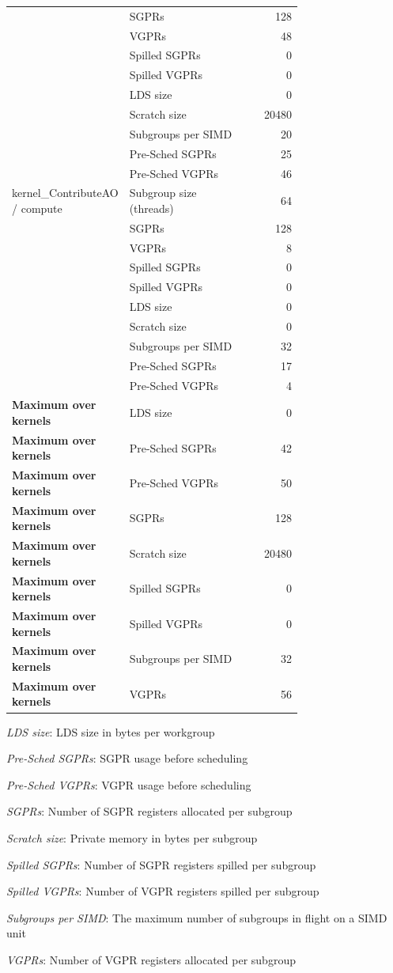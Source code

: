 \begin{longtable}{p{0.30\linewidth}p{0.43\linewidth}r}
 & SGPRs & 128 \\
 & VGPRs & 48 \\
 & Spilled SGPRs & 0 \\
 & Spilled VGPRs & 0 \\
 & LDS size & 0 \\
 & Scratch size & 20480 \\
 & Subgroups per SIMD & 20 \\
 & Pre-Sched SGPRs & 25 \\
 & Pre-Sched VGPRs & 46 \\
\hline
kernel\_ContributeAO / compute & Subgroup size (threads) & 64 \\
 & SGPRs & 128 \\
 & VGPRs & 8 \\
 & Spilled SGPRs & 0 \\
 & Spilled VGPRs & 0 \\
 & LDS size & 0 \\
 & Scratch size & 0 \\
 & Subgroups per SIMD & 32 \\
 & Pre-Sched SGPRs & 17 \\
 & Pre-Sched VGPRs & 4 \\
\hline
\textbf{Maximum over kernels} & LDS size & 0 \\
\textbf{Maximum over kernels} & Pre-Sched SGPRs & 42 \\
\textbf{Maximum over kernels} & Pre-Sched VGPRs & 50 \\
\textbf{Maximum over kernels} & SGPRs & 128 \\
\textbf{Maximum over kernels} & Scratch size & 20480 \\
\textbf{Maximum over kernels} & Spilled SGPRs & 0 \\
\textbf{Maximum over kernels} & Spilled VGPRs & 0 \\
\textbf{Maximum over kernels} & Subgroups per SIMD & 32 \\
\textbf{Maximum over kernels} & VGPRs & 56 \\
\hline
\end{longtable}
\noindent\textit{LDS size}: LDS size in bytes per workgroup\par
\noindent\textit{Pre-Sched SGPRs}: SGPR usage before scheduling\par
\noindent\textit{Pre-Sched VGPRs}: VGPR usage before scheduling\par
\noindent\textit{SGPRs}: Number of SGPR registers allocated per subgroup\par
\noindent\textit{Scratch size}: Private memory in bytes per subgroup\par
\noindent\textit{Spilled SGPRs}: Number of SGPR registers spilled per subgroup\par
\noindent\textit{Spilled VGPRs}: Number of VGPR registers spilled per subgroup\par
\noindent\textit{Subgroups per SIMD}: The maximum number of subgroups in flight on a SIMD unit\par
\noindent\textit{VGPRs}: Number of VGPR registers allocated per subgroup\par
\endgroup
